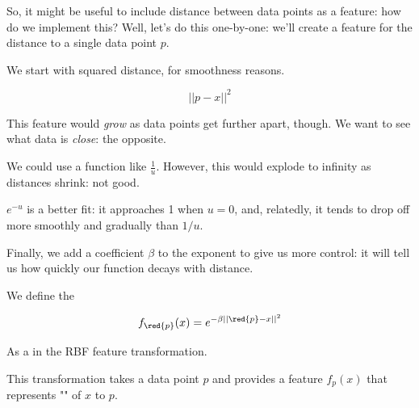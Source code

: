             So, it might be useful to include distance between data points as a feature: how do we implement this? Well, let's do this one-by-one: we'll create a feature for the distance to a single data point $p$.
            
            We start with squared distance, for smoothness reasons.

            \begin{equation}
                ||p-x||^2
            \end{equation}

            This feature would \textit{grow} as data points get further apart, though. We want to see what data is \textit{close}: the opposite.

            We could use a function like $\frac{1}{u}$. However, this would explode to infinity as distances shrink: not good.

            $e^{-u}$ is a better fit: it approaches 1 when $u=0$, and, relatedly, it tends to drop off more smoothly and gradually than $1/u$. 

            Finally, we add a coefficient $\beta$ to the exponent to give us more control: it will tell us how quickly our function decays with distance.
                \\

            \begin{definition}
                We define the 

                \begin{equation*}
                    f_{ \red{p} }(x) = e^{-\beta ||\red{p}-x||^2 }
                \end{equation*}

                As a  in the RBF feature transformation.

                This transformation takes a data point $p$ and provides a feature $f_p(x)$ that represents "" of $x$ to $p$.
            \end{definition}

